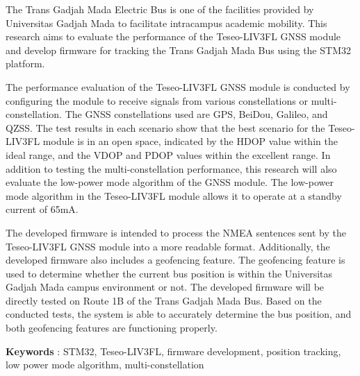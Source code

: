 The Trans Gadjah Mada Electric Bus is one of the facilities provided by Universitas Gadjah Mada to facilitate intracampus academic mobility. This research aims to evaluate the performance of the Teseo-LIV3FL GNSS module and develop firmware for tracking the Trans Gadjah Mada Bus using the STM32 platform.

The performance evaluation of the Teseo-LIV3FL GNSS module is conducted by configuring the module to receive signals from various constellations or multi-constellation. The GNSS constellations used are GPS, BeiDou, Galileo, and QZSS. The test results in each scenario show that the best scenario for the Teseo-LIV3FL module is in an open space, indicated by the HDOP value within the ideal range, and the VDOP and PDOP values within the excellent range. In addition to testing the multi-constellation performance, this research will also evaluate the low-power mode algorithm of the GNSS module. The low-power mode algorithm in the Teseo-LIV3FL module allows it to operate at a standby current of 65mA.

The developed firmware is intended to process the NMEA sentences sent by the Teseo-LIV3FL GNSS module into a more readable format. Additionally, the developed firmware also includes a geofencing feature. The geofencing feature is used to determine whether the current bus position is within the Universitas Gadjah Mada campus environment or not. The developed firmware will be directly tested on Route 1B of the Trans Gadjah Mada Bus. Based on the conducted tests, the system is able to accurately determine the bus position, and both geofencing features are functioning properly.

\noindent\textbf{Keywords} : STM32, Teseo-LIV3FL, firmware development, position tracking, low power mode algorithm, multi-constellation